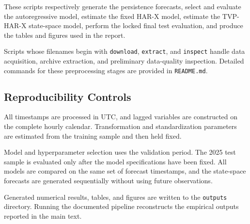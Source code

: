These scripts respectively generate the persistence forecasts,
select and evaluate the autoregressive model, estimate the
fixed HAR-X model, estimate the TVP-HAR-X state-space model,
perform the locked final test evaluation, and produce the
tables and figures used in the report.

Scripts whose filenames begin with \texttt{download},
\texttt{extract}, and \texttt{inspect} handle data acquisition,
archive extraction, and preliminary data-quality inspection.
Detailed commands for these preprocessing stages are provided
in \texttt{README.md}.

\subsection{Reproducibility Controls}

All timestamps are processed in UTC, and lagged variables are
constructed on the complete hourly calendar. Transformation
and standardization parameters are estimated from the training
sample and then held fixed.

Model and hyperparameter selection uses the validation period.
The 2025 test sample is evaluated only after the model
specifications have been fixed. All models are compared on the
same set of forecast timestamps, and the state-space forecasts
are generated sequentially without using future observations.

Generated numerical results, tables, and figures are written
to the \texttt{outputs} directory. Running the documented
pipeline reconstructs the empirical outputs reported in the
main text.